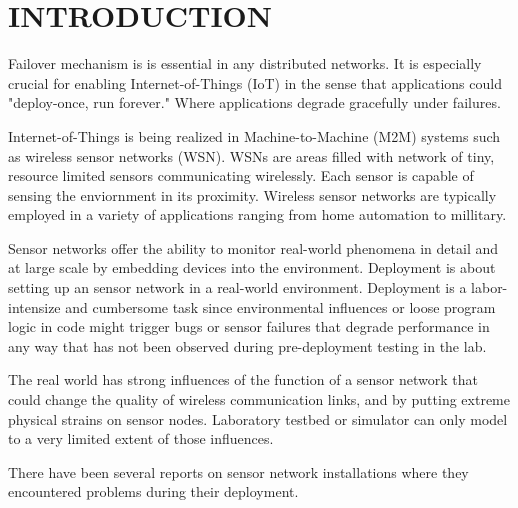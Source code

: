 \cleardoublepage
\singlespacing
\chapter{INTRODUCTION}
\label{c:intro}
\doublespacing\nointerlineskip


Failover mechanism is is essential in any distributed networks. It is especially
crucial for enabling Internet-of-Things (IoT) in the sense that applications
could "deploy-once, run forever." Where applications degrade gracefully under
failures.


Internet-of-Things is being realized in Machine-to-Machine (M2M) systems such as
wireless sensor networks (WSN).  WSNs are areas filled with network of tiny,
resource limited sensors communicating wirelessly. Each sensor is
capable of sensing the enviornment in its proximity. Wireless sensor
networks are typically employed in a variety of applications ranging
from home automation to millitary.

Sensor networks offer the ability to monitor real-world phenomena in detail and
at large scale by embedding devices into the environment. Deployment is
about setting up an sensor network in a real-world environment. Deployment is
a labor-intensize and cumbersome task since environmental influences or
loose program logic in code might trigger bugs or sensor failures that
degrade performance in any way that has not been observed during pre-deployment
testing in the lab.

The real world has strong influences of the function of a sensor network that
could change the quality of wireless communication links, and by putting
extreme physical strains on sensor nodes. Laboratory testbed or simulator can 
only model to a very limited extent of those influences.

There have been several reports on sensor network installations where they
encountered problems during their
deployment\cite{Barrenetxea2008,Polastre2004,Arora2004,Tateson2005,Padhy2005,Stoianov2007,Tolle2005,Werner-Allen2006a}.


